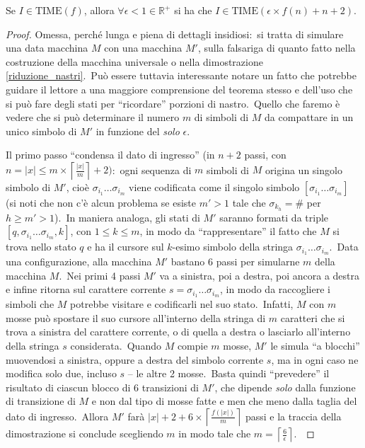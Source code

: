 \begin{theorem} 
    \hfill

    Se $I \in \mathrm{TIME}(f)$, allora $\forall \epsilon < 1 \in \mathbb{R}^+$ si ha che $I \in \mathrm{TIME}( \epsilon \times f(n) + n + 2)$.
\end{theorem}
\begin{proof}
    Omessa, perché lunga e piena di dettagli insidiosi:\ si tratta di simulare una data macchina $M$ con una macchina $M'$, sulla falsariga di quanto fatto nella costruzione della macchina universale o nella dimostrazione \ref{riduzione_nastri}.\
    Può essere tuttavia interessante notare un fatto che potrebbe guidare il lettore a una maggiore comprensione del teorema stesso e dell'uso che si può fare degli stati per ``ricordare'' porzioni di nastro.\
    Quello che faremo è vedere che si può determinare il numero $m$ di simboli di $M$ da compattare in un unico simbolo di $M'$ in funzione del \textit{solo} $\epsilon$.\

    Il primo passo ``condensa il dato di ingresso'' (in $n + 2$ passi, con $n = |x| \leq m \times \left\lceil \frac{|x|}{m}\right\rceil + 2)$:\ ogni sequenza di $m$ simboli di $M$ origina un singolo simbolo di $M'$, cioè $\sigma_{i_1} \dots \sigma_{i_m}$ viene codificata come il singolo simbolo $[\sigma_{i_1} \dots \sigma_{i_m}]$ (si noti che non c'è alcun problema se esiste $m' > 1$ tale che $\sigma_{k_h} = \#$ per $h \geq m' > 1$).\
    In maniera analoga, gli stati di $M'$ saranno formati da triple $[q, \sigma_{i_1} \dots \sigma_{i_m}, k]$, con $1 \leq k \leq m$, in modo da ``rappresentare'' il fatto che $M$ si trova nello stato $q$ e ha il cursore sul $k$-esimo simbolo della stringa $\sigma_{i_1} \dots \sigma_{i_m}$.\
    Data una configurazione, alla macchina $M'$ bastano 6 passi per simularne $m$ della macchina $M$.\
    Nei primi 4 passi $M'$ va a sinistra, poi a destra, poi ancora a destra e infine ritorna sul carattere corrente $s = \sigma_{i_1} \dots \sigma_{i_m}$, in modo da raccogliere i simboli che $M$ potrebbe visitare e codificarli nel suo stato.\
    Infatti, $M$ con $m$ mosse può spostare il suo cursore all'interno della stringa di $m$ caratteri che si trova a sinistra del carattere corrente, o di quella a destra o lasciarlo all'interno della stringa $s$ considerata.\
    Quando $M$ compie $m$ mosse, $M'$ le simula ``a blocchi'' muovendosi a sinistra, oppure a destra del simbolo corrente $s$, ma in ogni caso ne modifica solo due, incluso $s$ -- le altre 2 mosse.\
    Basta quindi ``prevedere'' il risultato di ciascun blocco di 6 transizioni di $M'$, che dipende \textit{solo} dalla funzione di transizione di $M$ e non dal tipo di mosse fatte e men che meno dalla taglia del dato di ingresso.\
    Allora $M'$ farà $|x| + 2 + 6 \times \left\lceil \frac{f(|x|)}{m}\right\rceil$ passi e la traccia della dimostrazione si conclude scegliendo $m$ in modo tale che $m = \left\lceil \frac{6}{\epsilon} \right\rceil$.\

\end{proof}

